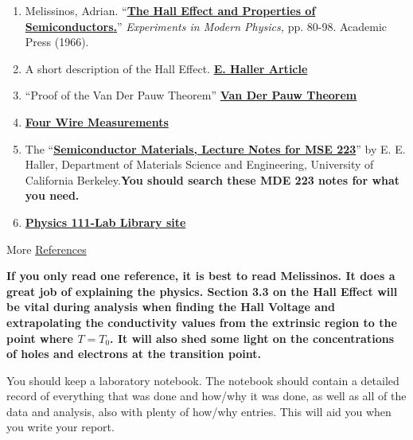 \documentclass{../lab}
\begin{document}
\begin{enumerate}
    \item Melissinos, Adrian. ``\href{http://physics111.lib.berkeley.edu/Physics111/Reprints/SHE/SHE\_Melissinos\_properties\_of\_semiconductors\_pg\_80-98\_1966.pdf}{\textbf{\textbf{The Hall Effect and Properties of Semiconductors}.}}'' \emph{Experiments in Modern Physics,} pp. 80-98. Academic Press (1966).

    \item A short description of the Hall Effect. \href{http://physics111.lib.berkeley.edu/Physics111/Reprints/SHE/24-Haller.pdf}{\textbf{E. Haller Article}}

    \item ``Proof of the Van Der Pauw Theorem'' \href{http://experimentationlab.berkeley.edu/node/105}{\textbf{\textbf{Van Der Pauw Theorem}}}

    \item \href{http://physics111.lib.berkeley.edu/Physics111/Reprints/SHE/19-Four\_Wire\_Measurement.pdf}{\textbf{Four Wire Measurements}}

    \item The ``\href{http://physics111.lib.berkeley.edu/Physics111/Reprints/SHE/Semiconductor\%20Materials\%20Notes\%20MSE\%20223\%20Haller.pdf}{\textbf{Semiconductor Materials, Lecture Notes for MSE 223}}'' by E. E. Haller, Department of Materials Science and Engineering, University of California Berkeley.\textbf{You should search these MDE 223 notes for what you need.}

    \item \href{\LabReprints}{\textbf{\textbf{Physics 111-Lab Library site}}}

\end{enumerate}

More \hyperref[sec:References]{References}

\textbf{If you only read one reference, it is best to read Melissinos. It does a great job of explaining the physics. Section 3.3 on the Hall Effect will be vital during analysis when finding the Hall Voltage and extrapolating the conductivity values from the extrinsic region to the point where $T = T_0$. It will also shed some light on the concentrations of holes and electrons at the transition point.}

You should keep a laboratory notebook. The notebook should contain a detailed record of everything that was done and how/why it was done, as well as all of the data and analysis, also with plenty of how/why entries. This will aid you when you write your report.
\end{document}

